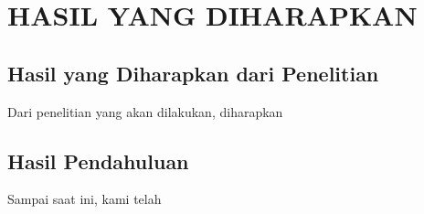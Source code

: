 \section{HASIL YANG DIHARAPKAN}

\subsection{Hasil yang Diharapkan dari Penelitian}

Dari penelitian yang akan dilakukan, diharapkan \lipsum[15]

\subsection{Hasil Pendahuluan}

Sampai saat ini, kami telah \lipsum[16]
